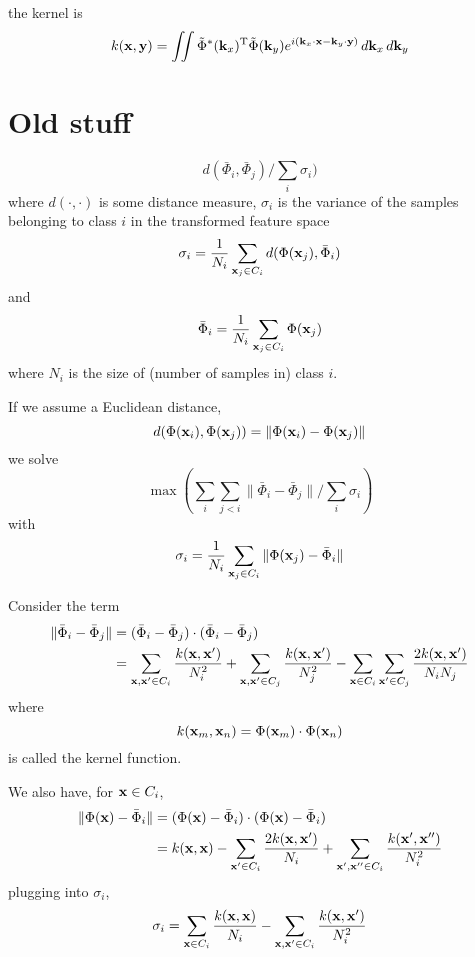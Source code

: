\documentclass{article}
\newcommand{\bx}{{\bf x}}
\newcommand{\by}{{\bf y}}
\newcommand{\bk}{{\bf k}}
\newcommand{\bxp}{\bx^{\prime}}
\newcommand{\bxpp}{\bx^{\prime \prime}}
\begin{document}
the kernel is
\[
k(\bx, \by) = \iint \tilde{\Phi}^*(\bk_x)^{\rm T}
\tilde{\Phi}(\bk_y) e^{i (\bk_x \cdot \bx - \bk_y \cdot \by)}
\, d \bk_x \, d \bk_y
\]


\section*{Old stuff}

\[
d(\bar{\Phi}_i, \bar{\Phi}_j)
\bigg / \sum_i \sigma_i )
\]
where $d(\cdot, \cdot)$ is some distance measure, $\sigma_i$ is the variance of
the samples belonging to class $i$
in the transformed feature space
\[
\sigma_i = \frac{1}{N_i} \sum_{\bx_j \in C_i} d( \Phi(\bx_j), \bar{\Phi}_i )
\]
and
\[
\bar{\Phi}_i = \frac{1}{N_i} \sum_{\bx_j \in C_i} \Phi(\bx_j)
\]
where $N_i$ is the size of (number of samples in) class $i$.


If we assume a Euclidean distance,
\[
d(\Phi(\bx_i), \Phi(\bx_j)) = \| \Phi(\bx_i) - \Phi(\bx_j) \|
\]
we solve
\[
\max ( \sum_i \sum_{j < i} \| \bar{\Phi}_i - \bar{\Phi}_j \|
\bigg / \sum_i \sigma_i )
\]
with
\[
\sigma_i = \frac{1}{N_i} \sum_{\bx_j \in C_i} \| \Phi(\bx_j) - \bar{\Phi}_i \|
\]

Consider the term
\begin{align*}
\| \bar{\Phi}_i - \bar{\Phi}_j \| &= 
(\bar{\Phi}_i - \bar{\Phi}_j) \cdot (\bar{\Phi}_i - \bar{\Phi}_j) \\
&= \sum_{\bx, \bxp \in C_i} \frac{k(\bx, \bxp)}{N_i^2} +
   \sum_{\bx, \bxp \in C_j} \frac{k(\bx, \bxp)}{N_j^2} -
   \sum_{\bx \in C_i} \sum_{\bxp \in C_j} \frac{2 k(\bx, \bxp)}{N_i N_j}
\end{align*}
where
\[
k(\bx_m, \bx_n) = \Phi(\bx_m) \cdot \Phi(\bx_n)
\]
is called the kernel function.

We also have, for $\bx \in C_i$,
\begin{align*}
\| \Phi(\bx) - \bar{\Phi}_i \| &= 
(\Phi(\bx) - \bar{\Phi}_i) \cdot (\Phi(\bx) - \bar{\Phi}_i) \\
&= k(\bx, \bx) -
   \sum_{\bxp \in C_i} \frac{2 k(\bx, \bxp)}{N_i} +
   \sum_{\bxp, \bxpp \in C_i} \frac{k(\bxp, \bxpp)}{N_i^2}
\end{align*}
plugging into $\sigma_i$,
\[
\sigma_i =
   \sum_{\bx \in C_i} \frac{k(\bx, \bx)}{N_i} -
   \sum_{\bx, \bxp \in C_i} \frac{k(\bx, \bxp)}{N_i^2}
\]
\end{document}
